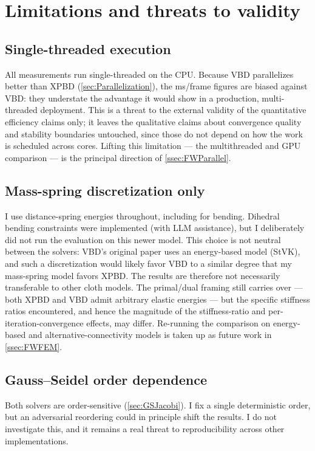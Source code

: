 \section{Limitations and threats to validity}
\label{sec:ThreatsValidity}

\subsection{Single-threaded execution}
\label{ssec:ThreatSingleThread}
All measurements run single-threaded on the CPU. Because VBD parallelizes better
than XPBD (\autoref{sec:Parallelization}), the ms/frame figures are biased against
VBD: they understate the advantage it would show in a production, multi-threaded
deployment. This is a threat to the external validity of the quantitative
efficiency claims only; it leaves the qualitative claims about convergence quality
and stability boundaries untouched, since those do not depend on how the work is
scheduled across cores. Lifting this limitation --- the multithreaded and GPU
comparison --- is the principal direction of \autoref{ssec:FWParallel}.

\subsection{Mass-spring discretization only}
\label{ssec:ThreatMassSpring}
I use distance-spring energies throughout, including for bending. Dihedral bending
constraints were implemented (with LLM assistance), but I deliberately did not run
the evaluation on this newer model. This choice is not neutral between the
solvers: VBD's original paper uses an energy-based model (StVK), and such a
discretization would likely favor VBD to a similar degree that my mass-spring model
favors XPBD. The results are therefore not necessarily transferable to other cloth
models. The primal/dual framing still carries over --- both XPBD and VBD admit
arbitrary elastic energies --- but the specific stiffness ratios encountered, and
hence the magnitude of the stiffness-ratio and per-iteration-convergence effects,
may differ. Re-running the comparison on energy-based and alternative-connectivity
models is taken up as future work in \autoref{ssec:FWFEM}.

\subsection{Gauss--Seidel order dependence}
\label{ssec:ThreatOrder}
Both solvers are order-sensitive (\autoref{sec:GSJacobi}). I fix a single
deterministic order, but an adversarial reordering could in principle shift the
results. I do not investigate this, and it remains a real threat to
reproducibility across other implementations.

